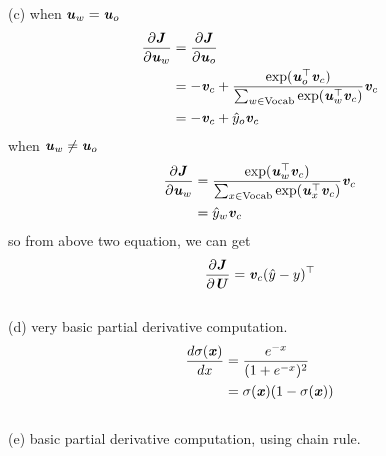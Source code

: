 \documentclass{article}
\begin{document}
(c) when \( \textbf{\textit{u}}_w = \textbf{\textit{u}}_o \)
\begin{equation*}
\begin{aligned}
    \frac {\partial \textbf{\textit{J}}} {\partial \textbf{\textit{u}}_w} &= \frac {\partial \textbf{\textit{J}}} {\partial \textbf{\textit{u}}_o} \\
    &= - \textbf{\textit{v}}_c + {\frac {\exp (\textbf{\textit{u}}_o^\top \textbf{\textit{v}}_c)} {\sum_{w \in {\rm Vocab}} {\exp (\textbf{\textit{u}}_w^\top \textbf{\textit{v}}_c)}} \textbf{\textit{v}}_c} \\
    &= - \textbf{\textit{v}}_c + \hat{y}_o \textbf{\textit{v}}_c
\end{aligned}
\end{equation*}
when \( \textbf{\textit{u}}_w \neq \textbf{\textit{u}}_o \)
\begin{equation*}
\begin{aligned}
    \frac {\partial \textbf{\textit{J}}} {\partial \textbf{\textit{u}}_w} &= \frac {\exp (\textbf{\textit{u}}_w^\top \textbf{\textit{v}}_c)} {\sum_{x \in {\rm Vocab}} {\exp (\textbf{\textit{u}}_x^\top \textbf{\textit{v}}_c)}} \textbf{\textit{v}}_c \\
    &= \hat{y}_w \textbf{\textit{v}}_c
\end{aligned}
\end{equation*}
so from above two equation, we can get
\begin{equation*}
    \frac {\partial \textbf{\textit{J}}} {\partial \textbf{\textit{U}}} = \textbf{\textit{v}}_c (\hat{y} - y)^\top
\end{equation*}
\\
(d) very basic partial derivative computation.
\begin{equation*}
\begin{aligned}
    \frac {d\sigma (\textbf{\textit{x}})} {dx} &= \frac {e^{-x}} {(1 + e^{-x})^2} \\
    &= \sigma (\textbf{\textit{x}}) (1 - \sigma (\textbf{\textit{x}}))
\end{aligned}
\end{equation*}
\\
(e) basic partial derivative computation, using chain rule.
\end{document}
